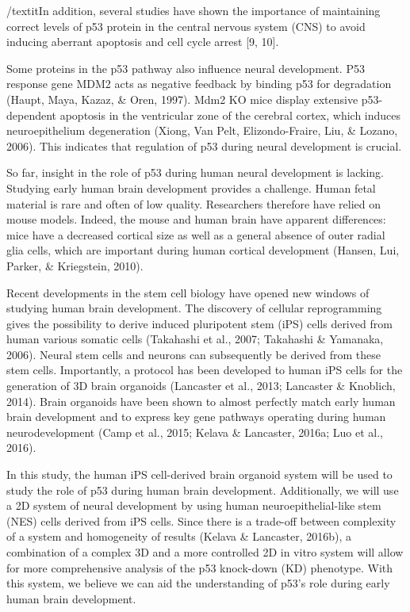 \documentclass[11pt,a4paper]{article}
\begin{document}
/textit{In addition, several studies have shown the importance of maintaining correct levels of p53 protein in the central nervous system (CNS) to avoid inducing aberrant apoptosis and cell cycle arrest [9, 10]. }

Some proteins in the p53 pathway also influence neural development. P53 response gene MDM2 acts as negative feedback by binding p53 for degradation (Haupt, Maya, Kazaz, \& Oren, 1997). Mdm2 KO mice display extensive p53-dependent apoptosis in the ventricular zone of the cerebral cortex, which induces neuroepithelium degeneration (Xiong, Van Pelt, Elizondo-Fraire, Liu, \& Lozano, 2006). This indicates that regulation of p53 during neural development is crucial. 

So far, insight in the role of p53 during human neural development is lacking. Studying early human brain development provides a challenge. Human fetal material is rare and often of low quality. Researchers therefore have relied on mouse models. Indeed, the mouse and human brain have apparent differences: mice have a decreased cortical size as well as a general absence of outer radial glia cells, which are important during human cortical development (Hansen, Lui, Parker, \& Kriegstein, 2010). 

Recent developments in the stem cell biology have opened new windows of studying human brain development. The discovery of cellular reprogramming gives the possibility to derive induced pluripotent stem (iPS) cells derived from human various somatic cells (Takahashi et al., 2007; Takahashi \& Yamanaka, 2006). Neural stem cells and neurons can subsequently be derived from these stem cells. Importantly, a protocol has been developed to human iPS cells for the generation of 3D brain organoids (Lancaster et al., 2013; Lancaster \& Knoblich, 2014). Brain organoids have been shown to almost perfectly match early human brain development and to express key gene pathways operating during human neurodevelopment (Camp et al., 2015; Kelava \& Lancaster, 2016a; Luo et al., 2016). 

In this study, the human iPS cell-derived brain organoid system will be used to study the role of p53 during human brain development. Additionally, we will use a 2D system of neural development by using human neuroepithelial-like stem (NES) cells derived from iPS cells. Since there is a trade-off between complexity of a system and homogeneity of results (Kelava \& Lancaster, 2016b), a combination of a complex 3D and a more controlled 2D in vitro system will allow for more comprehensive analysis of the p53 knock-down (KD) phenotype. With this system, we believe we can aid the understanding of p53's role during early human brain development.  
\end{document}
